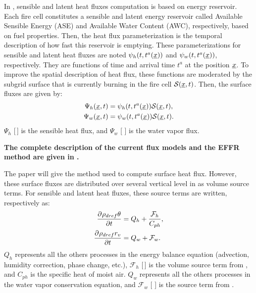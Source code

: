 In \Blaze, sensible and latent heat fluxes computation is based on energy reservoir. Each fire cell constitutes a sensible and latent energy reservoir called Available Sensible Energy (ASE) and Available Water Content (AWC), respectively, based on fuel properties. Then, the heat flux parameterization is the temporal description of how fast this reservoir is emptying. These parameterizations for sensible and latent heat fluxes are noted $\psi_h(t, t^a(\underline{x}))$ and $\psi_w(t, t^a(\underline{x}))$, respectively. They are functions of time and arrival time $t^a$ at the position $\underline{x}$.
To improve the spatial description of heat flux, these functions are moderated by the subgrid surface that is currently burning in the fire cell $\mathcal S (\underline{x}, t)$. 
Then, the surface fluxes are given by:
\begin{align}
	\Psi_h (\underline{x}, t) &= \psi_h(t, t^a(\underline{x})) \mathcal S (\underline{x}, t), \\
	\Psi_w (\underline{x}, t) &= \psi_w(t, t^a(\underline{x})) \mathcal S (\underline{x}, t).
\end{align}
$\Psi_h$ [\watt\,\rpsquare\meter] is the sensible heat flux, and $\Psi_w$ [\kilo\gram\,\reciprocal\second\,\rpsquare\meter] is the water vapor flux. 

\textbf{The complete description of the current flux models and the EFFR method are given in \citep{costes2021subgrid}.}

The paper will give the method used to compute surface heat flux. However, these surface fluxes are distributed over several vertical level in \MNH{} as volume source terms. For sensible and latent heat fluxes, these source terms are written, respectively as:
\begin{align}
	\frac{\partial^{} \rho_{dref} \theta}{\partial t} &= Q_h + \frac{\mathcal F_h}{C_{ph}}, \\
	\frac{\partial^{} \rho_{dref} r_v}{\partial t} &= Q_w + \mathcal F_w.
\end{align} 
$Q_h$ represents all the others processes in the \MNH{} energy balance equation (advection, humidity correction, phase change, etc.), $\mathcal F_h$ [\watt\,\rpcubic\meter] is the volume source term from \Blaze, and $C_{ph}$ is the specific heat of moist air. 
$Q_w$ represents all the others processes in the \MNH{} water vapor conservation equation, and $\mathcal F_w$ [\kilo\gram\,\reciprocal\second\,\rpcubic\meter] is the source term from \Blaze.

